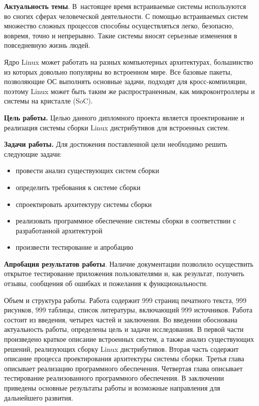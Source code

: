 
\textbf{Актуальность темы}. В~настоящее время встраиваемые системы используются во сногих сферах человеческой деятельности. С помощью встраиваемых систем множество сложных процессов способны осуществляться легко, безопасно, вовремя, точно и непрерывно. Такие системы вносят серьезные изменения в повседневную жизнь людей.

Ядро Linux может работать на разных компьютерных архитектурах, большинство из которых довольно популярны во встроенном мире. Все базовые пакеты, позволяющие ОС выполнять основные задачи, подходят для кросс-компиляции, поэтому Linux может быть таким же распространенным, как микроконтроллеры и системы на кристалле (SoC).

\textbf{Цель работы.} Целью данного дипломного проекта является проектирование и реализация системы сборки Linux дистрибутивов для встроенных систем.

\textbf{Задачи работы.} Для достижения поставленной цели необходимо решить следующие задачи:

\begin{itemize}
  \item провести анализ существующих систем сборки 
  \item определить требования к системе сборки 
  \item спроектировать архитектуру системы сборки 
  \item реализовать программное обеспечение системы сборки в соответствии с разработанной архитектурой 
  \item произвести тестирование и апробацию
\end{itemize}

\textbf{Апробация результатов работы}. Наличие документации позволило осуществить открытое тестирование приложения пользователями и, как результат, получить отзывы, сообщения об ошибках и пожелания к функциональности.


Объем и структура работы. 
Работа содержит 999 страниц печатного текста, 999 рисунков, 999 таблицы, список литературы, включающий 999 источников. 
Работа состоит из введения, четырех частей и заключения. 
Во введении обоснована актуальность работы, определены цель и задачи исследования. 
В первой части произведено краткое описание встроенных систем, а также анализ существующих решений, реализующих сборку Linux дистрибутивов. 
Вторая часть содержит описание процесса проектирования архитектуры системы сборки. 
Третья глава описывает реализацию программного обеспечения. 
Четвертая глава описывает тестирование реализованного программного обеспечения. 
В заключении приведены основные результаты работы и возможные направления для дальнейшего развития.
\newpage
